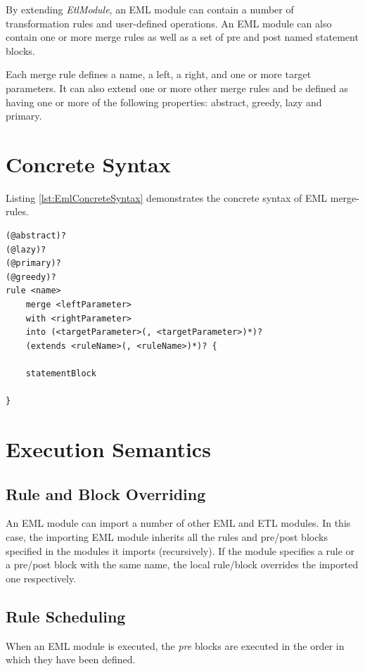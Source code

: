 By extending \emph{EtlModule}, an EML module can contain a number of transformation rules and user-defined operations. An EML module can also contain one or more merge rules as well as a set of pre and post named statement blocks.

Each merge rule defines a name, a left, a right, and one or more target parameters. It can also extend one or more other merge rules and be defined as having one or more of the following properties: abstract, greedy, lazy and primary.

\section{Concrete Syntax}

Listing \ref{lst:EmlConcreteSyntax} demonstrates the concrete syntax of EML merge-rules.

\begin{lstlisting}[basicstyle=\ttfamily\footnotesize, flexiblecolumns=true, numbers=none, nolol=true, caption=Concrete syntax of an EML merge-rule, label=lst:EmlConcreteSyntax, language=EML, tabsize=2]
(@abstract)?
(@lazy)?
(@primary)?
(@greedy)?
rule <name>
	merge <leftParameter>
	with <rightParameter>
	into (<targetParameter>(, <targetParameter>)*)?
	(extends <ruleName>(, <ruleName>)*)? {

	statementBlock
	
}
\end{lstlisting}

\section{Execution Semantics}

\subsection{Rule and Block Overriding}
An EML module can import a number of other EML and ETL modules. In this case, the importing EML module inherits all the rules and pre/post blocks specified in the modules it imports (recursively). If the module specifies a rule or a pre/post block with the same name, the local rule/block overrides the imported one respectively.

\subsection{Rule Scheduling}
When an EML module is executed, the \emph{pre} blocks are executed in the order in which they have been defined.

